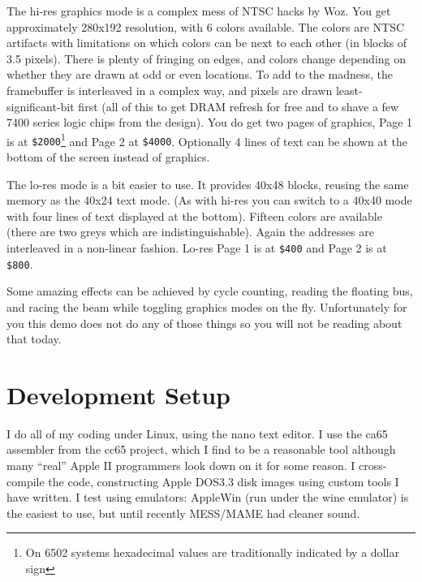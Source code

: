 \documentclass[twocolumn]{article}
\begin{document}
The hi-res graphics mode is a complex mess of NTSC hacks by Woz.
You get approximately 280x192 resolution, with 6 colors available.
The colors are NTSC artifacts with limitations 
on which colors can be next to each other (in blocks of 3.5 pixels).
There is plenty of fringing on edges, and colors change depending on
whether they are drawn at odd or even locations.
To add to the madness, the framebuffer is interleaved in a complex way,
and pixels are drawn least-significant-bit first (all of this to get
DRAM refresh for free and to shave a few 7400 series logic chips from
the design).
You do get two pages of graphics, Page 1 is at
{\tt \$2000}\footnote{On 6502 systems hexadecimal values are 
traditionally indicated by a dollar sign}
and Page 2 at {\tt \$4000}.
Optionally 4 lines of text can be shown at the bottom of the
screen instead of graphics.

The lo-res mode is a bit easier to use.  
It provides 40x48 blocks, reusing the same memory as the 40x24 text mode.
(As with hi-res you can switch to a 40x40 mode with four lines of
text displayed at the bottom).
Fifteen colors are available (there are two greys which are indistinguishable).
Again the addresses are interleaved in a non-linear fashion.
Lo-res Page 1 is at {\tt \$400} and Page 2 is at {\tt \$800}.

Some amazing effects can be achieved by cycle counting, reading
the floating bus, and racing the beam while toggling graphics
modes on the fly.
Unfortunately for you this demo does not do any of those things
so you will not be reading about that today.




\section{Development Setup}

I do all of my coding under Linux, using the nano text editor.
I use the ca65 assembler from the cc65 project, which I find to be a reasonable
tool although many ``real'' Apple II programmers look down on it for some
reason.
I cross-compile the code, constructing Apple DOS3.3 disk images using
custom tools I have written.
I test using emulators:
AppleWin (run under the wine emulator) is the easiest to use, but
until recently MESS/MAME had cleaner sound.
\end{document}
